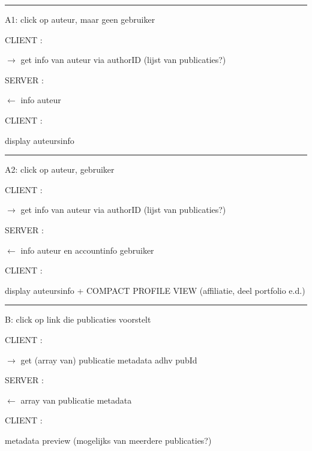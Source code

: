 \documentclass{article}
\begin{document}
\begin{description}
\hrule
\vspace{2 mm}
 
\item A1: click op auteur, maar geen gebruiker
\item  CLIENT : 
	\begin{description}
	\item $\rightarrow$ get info van auteur via authorID (lijst van publicaties?)
	\end{description}
	
\item SERVER : 
\begin{description}
	\item $\leftarrow$ info auteur
	\end{description}
	
\item CLIENT :  
	\begin{description}
	\item display auteursinfo
	\end{description}
	
\hrule
\vspace{2 mm}


\item A2: click op auteur, gebruiker
\item  CLIENT : 
	\begin{description}
	\item $\rightarrow$ get info van auteur via authorID (lijst van publicaties?)
	\end{description}
	
\item SERVER : 
\begin{description}
	\item $\leftarrow$ info auteur en accountinfo gebruiker 
	\end{description}
	
\item CLIENT :  
	\begin{description}
	\item display auteursinfo + COMPACT PROFILE VIEW (affiliatie, deel portfolio e.d.)
	\end{description}
	
\hrule
\vspace{2 mm}


\item B: click op link die publicaties voorstelt
\item  CLIENT : 
	\begin{description}
	\item $\rightarrow$ get (array van) publicatie metadata adhv pubId
	\end{description}
	
\item SERVER : 
\begin{description}
	\item $\leftarrow$ array van publicatie metadata 
	\end{description}
	
\item CLIENT :  
	\begin{description}
	\item metadata preview (mogelijks van meerdere publicaties?)
	\end{description}
	
\end{description}
\end{document}
